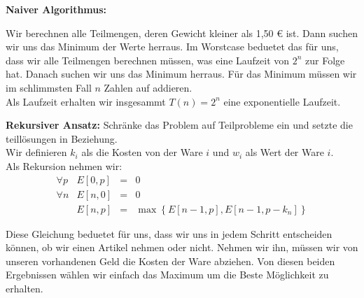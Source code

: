 \begin{description}

\item{\bfseries Naiver Algorithmus:}

Wir berechnen alle Teilmengen, deren Gewicht kleiner als 1,50 \euro{} ist. Dann suchen wir uns das Minimum der Werte herraus. Im Worstcase beduetet das für uns, dass wir alle Teilmengen berechnen müssen, was eine Laufzeit von $2^n$ zur Folge hat. Danach suchen wir uns das Minimum herraus.
Für das Minimum müssen wir im schlimmsten Fall $n$ Zahlen auf addieren.\\

Als Laufzeit erhalten wir insgesammt $T(n) = 2^n$ eine exponentielle Laufzeit.

\item{\bfseries Rekursiver Ansatz:} Schränke das Problem auf Teilprobleme ein und setzte die teillösungen in Beziehung.\\

Wir definieren $k_i$ als die Kosten von der Ware $i$ und $w_i$ als Wert der Ware $i$.\\
Als Rekursion nehmen wir:
$$
\begin{array}{lrcl}
\forall p  & E[0,p] & = & 0\\
\forall n & E[n,0]&=& 0\\
&E[n,p] &=& \max \left\{ E[n-1, p] , E[n-1, p - k_n] \right\}
\end{array}
$$

Diese Gleichung beduetet für uns, dass wir uns in jedem Schritt entscheiden können, ob wir einen Artikel nehmen oder nicht. Nehmen wir ihn, müssen wir von unseren vorhandenen Geld die Kosten der Ware abziehen. Von diesen beiden Ergebnissen wählen wir einfach das Maximum um die Beste Möglichkeit zu erhalten.
\end{description}